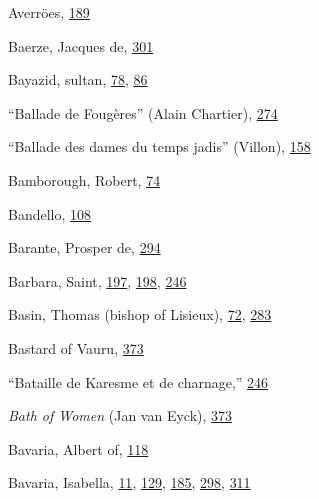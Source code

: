 Averröes,
\protect\hyperlink{13_Chapter_Six__THE_DEPICTION_OF_TH.xhtmlux5cux23page_189}{189}

Baerze, Jacques de,
\protect\hyperlink{20_ILLUSTRATIONS_FOLLOW_PAGE.xhtmlux5cux23page_301}{301}

Bayazid, sultan,
\protect\hyperlink{10_Chapter_Three__THE_HEROIC_DREAM.xhtmlux5cux23page_78}{78},
\protect\hyperlink{10_Chapter_Three__THE_HEROIC_DREAM.xhtmlux5cux23page_86}{86}

``Ballade de Fougères'' (Alain Chartier),
\protect\hyperlink{18_Chapter_Eleven__THE_FORMS_OF_THO.xhtmlux5cux23page_274}{274}

``Ballade des dames du temps jadis'' (Villon),
\protect\hyperlink{12_Chapter_Five__THE_VISION_OF_DEAT.xhtmlux5cux23page_158}{158}

Bamborough, Robert,
\protect\hyperlink{10_Chapter_Three__THE_HEROIC_DREAM.xhtmlux5cux23page_74}{74}

Bandello,
\protect\hyperlink{10_Chapter_Three__THE_HEROIC_DREAM.xhtmlux5cux23page_108}{108}

Barante, Prosper de,
\protect\hyperlink{19_Chapter_Twelve__ART_IN_LIFE.xhtmlux5cux23page_294}{294}

Barbara, Saint,
\protect\hyperlink{13_Chapter_Six__THE_DEPICTION_OF_TH.xhtmlux5cux23page_197}{197},
\protect\hyperlink{13_Chapter_Six__THE_DEPICTION_OF_TH.xhtmlux5cux23page_198}{198},
\protect\hyperlink{16_Chapter_Nine__THE_DECLINE_OF_SYM.xhtmlux5cux23page_246}{246}

Basin, Thomas (bishop of Lisieux),
\protect\hyperlink{10_Chapter_Three__THE_HEROIC_DREAM.xhtmlux5cux23page_72}{72},
\protect\hyperlink{18_Chapter_Eleven__THE_FORMS_OF_THO.xhtmlux5cux23page_283}{283}

Bastard of Vauru,
\protect\hyperlink{21_Chapter_Thirteen__IMAGE_AND_WORD.xhtmlux5cux23page_373}{373}

``Bataille de Karesme et de charnage,''
\protect\hyperlink{16_Chapter_Nine__THE_DECLINE_OF_SYM.xhtmlux5cux23page_246}{246}

\emph{Bath of Women} (Jan van Eyck),
\protect\hyperlink{21_Chapter_Thirteen__IMAGE_AND_WORD.xhtmlux5cux23page_373}{373}

Bavaria, Albert of,
\protect\hyperlink{10_Chapter_Three__THE_HEROIC_DREAM.xhtmlux5cux23page_118}{118}

Bavaria, Isabella,
\protect\hyperlink{08_Chapter_One__THE_PASSIONATE_INTE.xhtmlux5cux23page_11}{11},
\protect\hyperlink{11_Chapter_Four__THE_FORMS_OF_LOVE.xhtmlux5cux23page_129}{129},
\protect\hyperlink{13_Chapter_Six__THE_DEPICTION_OF_TH.xhtmlux5cux23page_185}{185},
\protect\hyperlink{20_ILLUSTRATIONS_FOLLOW_PAGE.xhtmlux5cux23page_298}{298},
\protect\hyperlink{20_ILLUSTRATIONS_FOLLOW_PAGE.xhtmlux5cux23page_311}{311}


